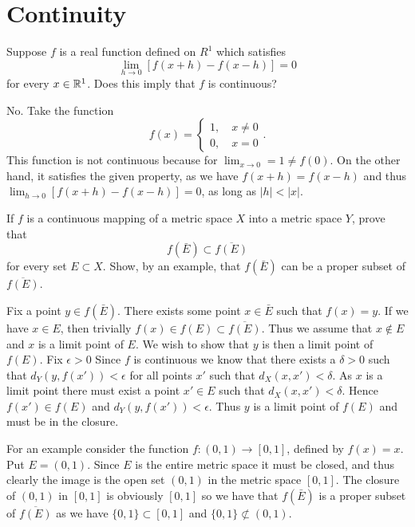 \section{Continuity}

\begin{problem}
  Suppose $f$ is a real function defined on $R^1$ which satisfies
  \[\lim_{h \to 0} [f(x + h) - f(x - h)] = 0\]
  for every $x \in \mathbb{R}^1$.
  Does this imply that $f$ is continuous?
\end{problem}

\begin{solution}
  No. Take the function
  \[f(x) = \begin{cases} 1, \quad x \neq 0\\ 0, \quad x = 0 \end{cases}.\]
  This function is not continuous because for $\lim_{x \to 0} = 1 \neq f(0)$.
  On the other hand, it satisfies the given property, as we have $f(x + h) = f(x - h)$ and thus $\lim_{h \to 0} [f(x + h) - f(x - h)] = 0$, as long as $|h| < |x|$.
\end{solution}

\begin{problem}
  If $f$ is a continuous mapping of a metric space $X$ into a metric space $Y$, prove that
  \[f(\bar{E}) \subset \overline{f(E)}\]
  for every set $E \subset X$.
  Show, by an example, that $f(\bar{E})$ can be a proper subset of $\overline{f(E)}$.
\end{problem}

\begin{solution}
  Fix a point $y \in f(\bar{E})$.
  There exists some point $x \in \bar{E}$ such that $f(x) = y$.
  If we have $x \in E$, then trivially $f(x) \in f(E) \subset \overline{f(E)}$.
  Thus we assume that $x \notin E$ and $x$ is a limit point of $E$.
  We wish to show that $y$ is then a limit point of $f(E)$.
  Fix $\epsilon > 0$
  Since $f$ is continuous we know that there exists a $\delta > 0$ such that $d_Y (y, f(x')) < \epsilon$ for all points $x'$ such that $d_X (x, x') < \delta$.
  As $x$ is a limit point there must exist a point $x' \in E$ such that $d_X (x, x') < \delta$.
  Hence $f(x') \in f(E)$ and $d_Y (y, f(x')) < \epsilon$.
  Thus $y$ is a limit point of $f(E)$ and must be in the closure.

  For an example consider the function $f : (0, 1) \to [0, 1]$, defined by $f(x) = x$.
  Put $E = (0, 1)$.
  Since $E$ is the entire metric space it must be closed, and thus clearly the image is the open set $(0, 1)$ in the metric space $[0, 1]$.
  The closure of $(0, 1)$ in $[0, 1]$ is obviously $[0, 1]$ so we have that $f(\bar{E})$ is a proper subset of $\overline{f(E)}$ as we have $\{0, 1\} \subset [0, 1]$ and $\{0, 1\} \not\subset (0, 1)$.
\end{solution}

